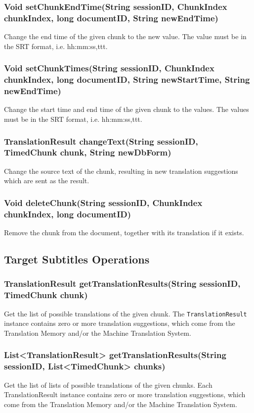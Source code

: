 \subsubsection{Void setChunkEndTime(String sessionID, ChunkIndex chunkIndex, long documentID, String newEndTime)}
Change the end time of the given chunk to the new value. The value must be in the SRT format, i.e. hh:mm:ss,ttt.

\subsubsection{Void setChunkTimes(String sessionID, ChunkIndex chunkIndex, long documentID, String newStartTime, String newEndTime)}
Change the start time and end time of the given chunk to the values. The values must be in the SRT format, i.e. hh:mm:ss,ttt.

\subsubsection{TranslationResult changeText(String sessionID, TimedChunk chunk, String newDbForm)}
Change the source text of the chunk,
resulting in new translation suggestions
which are sent as the result.


\subsubsection{Void deleteChunk(String sessionID, ChunkIndex chunkIndex, long documentID)}
Remove the chunk from the document, together with its translation if it exists.

\subsection{Target Subtitles Operations}

\subsubsection{TranslationResult getTranslationResults(String sessionID, TimedChunk chunk)}
Get the list of possible translations of the given chunk.
The {\tt TranslationResult} instance contains zero or more translation suggestions, which come from the Translation Memory and/or the Machine Translation System.

\subsubsection{List<TranslationResult> getTranslationResults(String sessionID, List<TimedChunk> chunks)}
Get the list of lists of possible translations of the given chunks.
Each TranslationResult instance contains zero or more translation suggestions, which come from the Translation Memory and/or the Machine Translation System.

